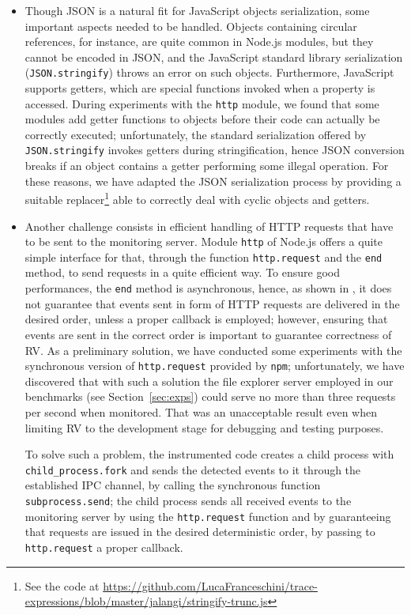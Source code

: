 \begin{itemize}
\item Though JSON is a natural fit for JavaScript objects serialization, some important aspects needed to be handled.
Objects containing circular references, for instance, are quite common in Node.js modules, but they cannot be encoded in JSON, and the JavaScript standard library serialization (\lstinline|JSON.stringify|) throws an error on such objects.
Furthermore, JavaScript supports getters, which are special functions invoked when a property is accessed.
During experiments with the \lstinline{http} module, we found that some modules add getter functions to objects before their code can actually be
correctly executed; unfortunately, the standard serialization offered by \lstinline|JSON.stringify| invokes getters during stringification, hence
JSON conversion  breaks if an object contains a getter performing some illegal operation. 
For these reasons, we have  adapted the JSON serialization process by providing a suitable replacer\footnote{See the code at \url{https://github.com/LucaFranceschini/trace-expressions/blob/master/jalangi/stringify-trunc.js}} able to correctly deal
with cyclic objects and getters.

\item Another challenge consists in efficient handling of HTTP requests that have to be sent to the 
  monitoring server. Module \lstinline{http} of Node.js offers a quite simple interface for that, through the  function
  \lstinline{http.request} and the \lstinline{end} method, to send requests in a quite efficient way. To ensure good performances, the \lstinline{end} method is asynchronous, hence, as shown in , it does not guarantee that events sent in form of HTTP requests are delivered in the  
  desired order, unless a proper callback is employed; however, ensuring that events are sent in the correct order is important to guarantee correctness of RV. As a preliminary solution, we have conducted some experiments with the
  synchronous version of \lstinline{http.request} provided by \lstinline{npm}; unfortunately, we have discovered that with such a solution
  the file explorer server employed in our benchmarks (see Section~\ref{sec:exps}) could serve no more than
  three requests per second when monitored. That was an unacceptable result even when limiting RV to the development stage
  for debugging and testing purposes.

  To solve such a problem, the instrumented code creates a child process with \lstinline{child_process.fork} and
  sends the detected events to it through the established IPC channel, by calling the synchronous function \lstinline{subprocess.send};
  the child process sends all received events to the monitoring server by using the \lstinline{http.request} function and by guaranteeing
  that requests are issued in the desired deterministic order, by passing to \lstinline{http.request} a proper callback.
\end{itemize}

